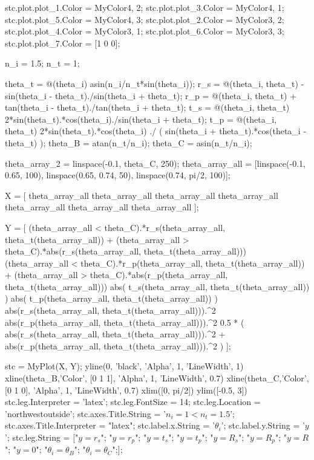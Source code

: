 \documentclass[UTF8]{report}
\theoremstyle{MyLineTheoremStyle} %
\theoremstyle{MyBlockTheoremStyle} %
\theoremstyle{MySubsubsectionStyle} %
\begin{document}
\begin{matlablisting}
    stc.plot.plot_1.Color = MyColor{4, 2};
    stc.plot.plot_3.Color = MyColor{4, 1};
    stc.plot.plot_5.Color = MyColor{4, 3};
    stc.plot.plot_2.Color = MyColor{3, 2};
    stc.plot.plot_4.Color = MyColor{3, 1};
    stc.plot.plot_6.Color = MyColor{3, 3}; 
    stc.plot.plot_7.Color = [1 0 0];   


n_i = 1.5;
n_t = 1;

theta_t = @(theta_i) asin(n_i/n_t*sin(theta_i));
r_s = @(theta_i, theta_t) - sin(theta_i - theta_t)./sin(theta_i + theta_t);
r_p = @(theta_i, theta_t) + tan(theta_i - theta_t)./tan(theta_i + theta_t);
t_s = @(theta_i, theta_t) 2*sin(theta_t).*cos(theta_i)./sin(theta_i + theta_t);
t_p = @(theta_i, theta_t) 2*sin(theta_t).*cos(theta_i) ./ ( sin(theta_i + theta_t).*cos(theta_i - theta_t) );
theta_B = atan(n_t/n_i);
theta_C = asin(n_t/n_i);

theta_array_2 = linspace(-0.1, theta_C, 250);
theta_array_all = [linspace(-0.1, 0.65, 100), linspace(0.65, 0.74, 50), linspace(0.74, pi/2, 100)];

X = [
    theta_array_all
    theta_array_all
    theta_array_all
    theta_array_all
    theta_array_all
    theta_array_all
    theta_array_all
];

Y = [
    (theta_array_all < theta_C).*r_s(theta_array_all, theta_t(theta_array_all)) + (theta_array_all > theta_C).*abs(r_s(theta_array_all, theta_t(theta_array_all)))
    (theta_array_all < theta_C).*r_p(theta_array_all, theta_t(theta_array_all)) + (theta_array_all > theta_C).*abs(r_p(theta_array_all, theta_t(theta_array_all)))
    abs( t_s(theta_array_all, theta_t(theta_array_all)) )
    abs( t_p(theta_array_all, theta_t(theta_array_all)) )
    abs(r_s(theta_array_all, theta_t(theta_array_all))).^2
    abs(r_p(theta_array_all, theta_t(theta_array_all))).^2
    0.5 * (  abs(r_s(theta_array_all, theta_t(theta_array_all))).^2 + abs(r_p(theta_array_all, theta_t(theta_array_all))).^2   )
    ];

stc = MyPlot(X, Y);
yline(0, 'black', 'Alpha', 1, 'LineWidth', 1)
xline(theta_B,'Color', [0 1 1], 'Alpha', 1, 'LineWidth', 0.7)
xline(theta_C,'Color', [0 1 0], 'Alpha', 1, 'LineWidth', 0.7)
xlim([0, pi/2])
ylim([-0.5, 3])
    stc.leg.Interpreter = 'latex';
    stc.leg.FontSize = 14;
    stc.leg.Location = 'northwestoutside';
    stc.axes.Title.String = '$n_i = 1 < n_t = 1.5$';
    stc.axes.Title.Interpreter = "latex";
    stc.label.x.String = '$\theta_i$';
    stc.label.y.String = '$y$';
    stc.leg.String = ["$y=r_s$"; "$y=r_p$"; "$y=t_s$"; "$y=t_p$"; "$y=R_s$"; "$y=R_p$"; "$y=R$"; "$y=0$";  "$\theta_i = \theta_B$"; "$\theta_i = \theta_C$";];
    

\end{matlablisting}
\end{document}
